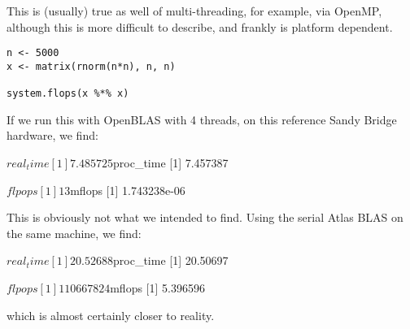 This is (usually) true as well of multi-threading, for example, via OpenMP, 
although this is more difficult to describe, and frankly is platform dependent.

\begin{lstlisting}[language=rr]
n <- 5000
x <- matrix(rnorm(n*n), n, n)

system.flops(x %*% x)
\end{lstlisting}

If we run this with OpenBLAS with 4 threads, on this reference Sandy Bridge 
hardware, we find:
\begin{Output}
$real_time
[1] 7.485725

$proc_time
[1] 7.457387

$flpops
[1] 13

$mflops
[1] 1.743238e-06
\end{Output}

This is obviously not what we intended to find.  Using the serial Atlas BLAS on 
the same machine, we find:
\begin{Output}
$real_time
[1] 20.52688

$proc_time
[1] 20.50697

$flpops
[1] 110667824

$mflops
[1] 5.396596
\end{Output}

which is almost certainly closer to reality.